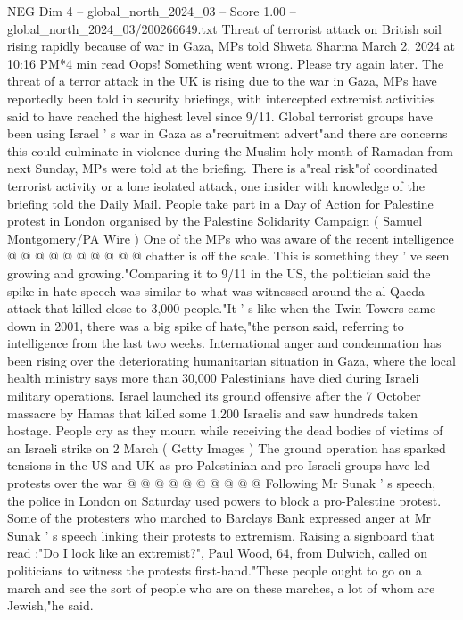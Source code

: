 \begin{textsample}{NEG Dim 4 – global\_north\_2024\_03 – Score 1.00 – global\_north\_2024\_03/200266649.txt}  \label{ex:f4_neg_226}
Threat of terrorist attack on British soil rising rapidly because of war in Gaza, MPs told Shweta Sharma March 2, 2024 at 10:16 PM*4 min read Oops!
Something went wrong.
Please try again later.
The threat of a terror attack in the UK is rising due to the war in Gaza, MPs have reportedly been told in security briefings, with intercepted extremist activities said to have reached the highest level since 9/11.
Global terrorist groups have been using Israel ' s war in Gaza as a"recruitment advert"and there are concerns this could culminate in violence during the Muslim holy month of Ramadan from next Sunday, MPs were told at the briefing.
There is a"real risk"of coordinated terrorist activity or a lone isolated attack, one insider with knowledge of the briefing told the Daily Mail.
People take part in a Day of Action for Palestine protest in London organised by the Palestine Solidarity Campaign ( Samuel Montgomery/PA Wire ) One of the MPs who was aware of the recent intelligence @ @ @ @ @ @ @ @ @ @ chatter is off the scale.
This is something they ' ve seen growing and growing."Comparing it to 9/11 in the US, the politician said the spike in hate speech was similar to what was witnessed around the al-Qaeda attack that killed close to 3,000 people."It ' s like when the Twin Towers came down in 2001, there was a big spike of hate,"the person said, referring to intelligence from the last two weeks.
International anger and condemnation has been rising over the deteriorating humanitarian situation in Gaza, where the local health ministry says more than 30,000 Palestinians have died during Israeli military operations.
Israel launched its ground offensive after the 7 October massacre by Hamas that killed some 1,200 Israelis and saw hundreds taken hostage.
People cry as they mourn while receiving the dead bodies of victims of an Israeli strike on 2 March ( Getty Images ) The ground operation has sparked tensions in the US and UK as pro-Palestinian and pro-Israeli groups have led protests over the war @ @ @ @ @ @ @ @ @ @ Following Mr Sunak ' s speech, the police in London on Saturday used powers to block a pro-Palestine protest.
Some of the protesters who marched to Barclays Bank expressed anger at Mr Sunak ' s speech linking their protests to extremism.
Raising a signboard that read :"Do I look like an extremist?", Paul Wood, 64, from Dulwich, called on politicians to witness the protests first-hand."These people ought to go on a march and see the sort of people who are on these marches, a lot of whom are Jewish,"he said.

\end{textsample}
